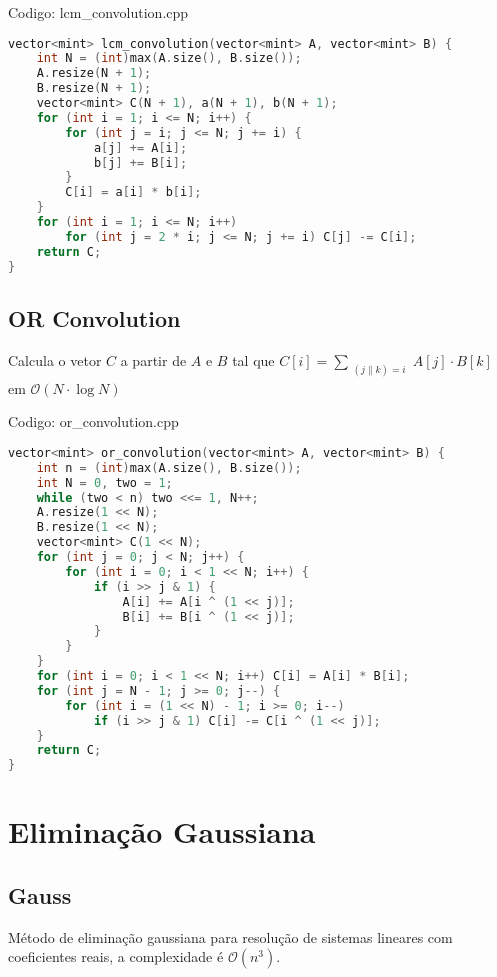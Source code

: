 \documentclass[10pt, a4paper, oneside]{book}
\begin{document}
Codigo: lcm\_convolution.cpp

\begin{lstlisting}[language=C++]
vector<mint> lcm_convolution(vector<mint> A, vector<mint> B) {
    int N = (int)max(A.size(), B.size());
    A.resize(N + 1);
    B.resize(N + 1);
    vector<mint> C(N + 1), a(N + 1), b(N + 1);
    for (int i = 1; i <= N; i++) {
        for (int j = i; j <= N; j += i) {
            a[j] += A[i];
            b[j] += B[i];
        }
        C[i] = a[i] * b[i];
    }
    for (int i = 1; i <= N; i++)
        for (int j = 2 * i; j <= N; j += i) C[j] -= C[i];
    return C;
}
\end{lstlisting}
\hfill

\subsection{OR Convolution}


Calcula o vetor $C$ a partir de $A$ e $B$ tal que $C[i] = \sum_{\substack{(j \| k) = i}} A[j] \cdot B[k]$ em $\mathcal{O}(N \cdot \log N)$

\hfill

Codigo: or\_convolution.cpp

\begin{lstlisting}[language=C++]
vector<mint> or_convolution(vector<mint> A, vector<mint> B) {
    int n = (int)max(A.size(), B.size());
    int N = 0, two = 1;
    while (two < n) two <<= 1, N++;
    A.resize(1 << N);
    B.resize(1 << N);
    vector<mint> C(1 << N);
    for (int j = 0; j < N; j++) {
        for (int i = 0; i < 1 << N; i++) {
            if (i >> j & 1) {
                A[i] += A[i ^ (1 << j)];
                B[i] += B[i ^ (1 << j)];
            }
        }
    }
    for (int i = 0; i < 1 << N; i++) C[i] = A[i] * B[i];
    for (int j = N - 1; j >= 0; j--) {
        for (int i = (1 << N) - 1; i >= 0; i--)
            if (i >> j & 1) C[i] -= C[i ^ (1 << j)];
    }
    return C;
}
\end{lstlisting}
\hfill

\section{Eliminação Gaussiana}
\subsection{Gauss}


Método de eliminação gaussiana para resolução de sistemas lineares com coeficientes reais, a complexidade é $\mathcal{O}(n^3)$.
\end{document}

